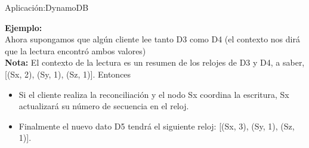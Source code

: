 \begin{frame}[fragile]{Aplicación:}{DynamoDB}
    \justifying

    {\bf Ejemplo:}\\[0.3cm]

    Ahora supongamos que algún cliente lee tanto D3 como D4 (el contexto nos dirá
    que la lectura encontró ambos valores)\\[0.3cm]

    {\bf Nota:} El contexto de la lectura es un resumen de los relojes de D3 y D4, a
    saber, [(Sx, 2), (Sy, 1), (Sz, 1)]. Entonces

\begin{itemize}
\item Si el cliente realiza la reconciliación y el nodo Sx coordina la escritura,
Sx actualizará su número de secuencia en el reloj.

\item Finalmente el nuevo dato D5 tendrá el siguiente reloj:
[(Sx, 3), (Sy, 1), (Sz, 1)].
\end{itemize}

\end{frame}
